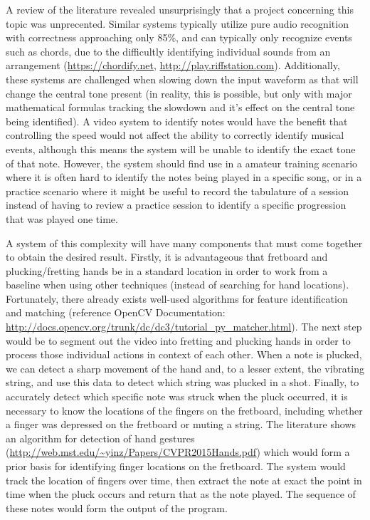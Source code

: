 A review of the literature revealed unsurprisingly that a project concerning this topic was unprecented.
Similar systems typically utilize pure audio recognition with correctness approaching only 85\%,
and can typically only recognize events such as chords, due to the difficultly identifying individual sounds
from an arrangement (\url{https://chordify.net}, \url{http://play.riffstation.com}).
Additionally, these systems are challenged when slowing down the input waveform as that will change the central
tone present (in reality, this is possible, but only with major mathematical formulas tracking the slowdown
and it's effect on the central tone being identified).
A video system to identify notes would have the benefit that controlling the speed would not affect the
ability to correctly identify musical events, although this means the system will be unable to identify
the exact tone of that note.
However, the system should find use in a amateur training scenario where it is often hard to identify
the notes being played in a specific song, or in a practice scenario where it might be useful to
record the tabulature of a session instead of having to review a practice session to identify a specific
progression that was played one time.
\par
A system of this complexity will have many components that must come together to obtain the desired result.
Firstly, it is advantageous that fretboard and plucking/fretting hands be in a standard location in order
to work from a baseline when using other techniques (instead of searching for hand locations).
Fortunately, there already exists well-used algorithms for feature identification and matching
(reference OpenCV Documentation: \url{http://docs.opencv.org/trunk/dc/dc3/tutorial_py_matcher.html}).
The next step would be to segment out the video into fretting and plucking hands in order to process
those individual actions in context of each other.
When a note is plucked, we can detect a sharp movement of the hand and, to a lesser extent,
the vibrating string, and use this data to detect which string was plucked in a shot.
Finally, to accurately detect which specific note was struck when the pluck occurred,
it is necessary to know the locations of the fingers on the fretboard,
including whether a finger was depressed on the fretboard or muting a string.
The literature shows an algorithm for detection of hand gestures
(\url{http://web.mst.edu/~yinz/Papers/CVPR2015Hands.pdf})
which would form a prior basis for identifying finger locations on the fretboard.
The system would track the location of fingers over time,
then extract the note at exact the point in time when the pluck occurs and return
that as the note played.
The sequence of these notes would form the output of the program.
